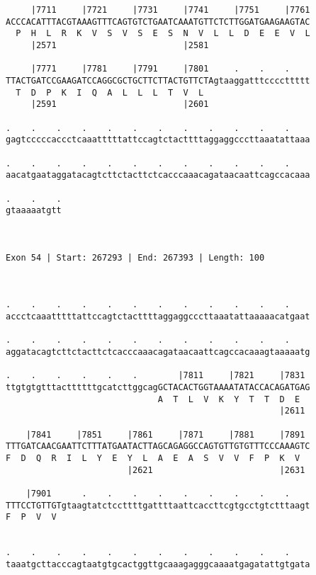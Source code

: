 \documentclass{article}
\begin{document}
\begin{Verbatim}
     |7711     |7721     |7731     |7741     |7751     |7761
ACCCACATTTACGTAAAGTTTCAGTGTCTGAATCAAATGTTCTCTTGGATGAAGAAGTAC
  P  H  L  R  K  V  S  V  S  E  S  N  V  L  L  D  E  E  V  L
     |2571                         |2581                    
  
     |7771     |7781     |7791     |7801     .    .    .    
TTACTGATCCGAAGATCCAGGCGCTGCTTCTTACTGTTCTAgtaaggatttccccttttt
  T  D  P  K  I  Q  A  L  L  L  T  V  L                     
     |2591                         |2601                    
  
.    .    .    .    .    .    .    .    .    .    .    .    
gagtcccccaccctcaaatttttattccagtctacttttaggaggcccttaaatattaaa
                                                            
.    .    .    .    .    .    .    .    .    .    .    .    
aacatgaataggatacagtcttctacttctcacccaaacagataacaattcagccacaaa
                                                            
.    .    .
gtaaaaatgtt
           
           
 
Exon 54 | Start: 267293 | End: 267393 | Length: 100



.    .    .    .    .    .    .    .    .    .    .    .    
accctcaaatttttattccagtctacttttaggaggcccttaaatattaaaaacatgaat
                                                            
.    .    .    .    .    .    .    .    .    .    .    .    
aggatacagtcttctacttctcacccaaacagataacaattcagccacaaagtaaaaatg
                                                            
.    .    .    .    .    .        |7811     |7821     |7831 
ttgtgtgtttacttttttgcatcttggcagGCTACACTGGTAAAATATACCACAGATGAG
                              A  T  L  V  K  Y  T  T  D  E  
                                                      |2611 
  
    |7841     |7851     |7861     |7871     |7881     |7891 
TTTGATCAACGAATTCTTTATGAATACTTAGCAGAGGCCAGTGTTGTGTTTCCCAAAGTC
F  D  Q  R  I  L  Y  E  Y  L  A  E  A  S  V  V  F  P  K  V  
                        |2621                         |2631 
  
    |7901      .    .    .    .    .    .    .    .    .    
TTTCCTGTTGTgtaagtatctccttttgattttaattcaccttcgtgcctgtctttaagt
F  P  V  V                                                  
                                                            
  
.    .    .    .    .    .    .    .    .    .    .    .    
taaatgcttacccagtaatgtgcactggttgcaaagagggcaaaatgagatattgtgata
                                                            

\end{Verbatim}
\end{document}
